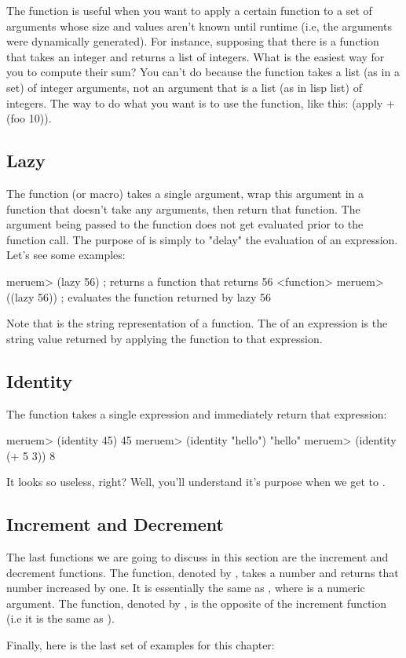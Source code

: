 The  function is useful when you want to apply a certain function to a set of arguments whose size and values aren't known until runtime (i.e, the arguments were dynamically generated). For instance, supposing that there is a function  that takes an integer and returns a list of integers. What is the easiest way for you to compute their sum? You can't do  because the \code{+} function takes a list (as in a set) of integer arguments, not an argument that is a list (as in lisp list)  of integers. The way to do what you want is to use the  function, like this: (apply + (foo 10)).

\subsection{Lazy}
The  function (or macro) takes a single argument, wrap this argument in a function that doesn't take any arguments, then return that function. The argument being passed to the  function does not get evaluated prior to the function call. The purpose of  is simply to "delay" the evaluation of an expression. Let's see some examples:

\begin{REPL}
meruem> (lazy 56)  ; returns a function that returns 56
<function>
meruem> ((lazy 56))  ; evaluates the function returned by lazy
56
\end{REPL}

Note that  is the string representation of a function. The  of an expression is the string value returned by applying the  function to that expression.

\subsection{Identity}
The  function takes a single expression and immediately return that expression:

\begin{REPL}
meruem> (identity 45)
45
meruem> (identity "hello")
"hello"
meruem> (identity (+ 5 3))
8
\end{REPL}

It looks so useless, right? Well, you'll understand it's purpose when we get to .

\subsection{Increment and Decrement}
The last functions we are going to discuss in this section are the increment and decrement functions. The  function, denoted by , takes a number and returns that number increased by one. It is essentially the same as , where  is a numeric argument. The  function, denoted by , is the opposite of the increment function (i.e it is the same as ). 


Finally, here is the last set of examples for this chapter:

\begin{REPL}
meruem> (inc 67)
68
meruem> (dec 30)
29
meruem> (inc 9.8)
10.8
meruem> (inc \a)
An error has occurred. Invalid Type. Not a Number: a
Source: .home.melvic.meruem.meruem.prelude [1:6}]
(inc \a)
     ^
\end{REPL}